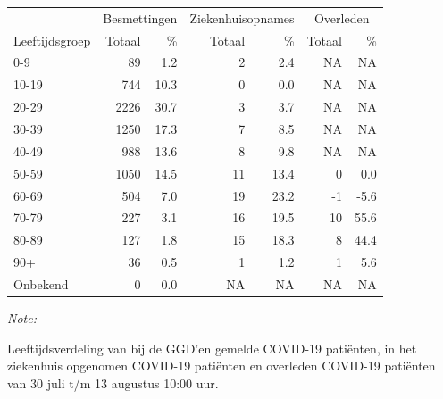 \documentclass[
  english,
  man,floatsintext]{apa6}
\begin{document}
\begin{table}[H]
\centering\begingroup\fontsize{11}{13}\selectfont

\begin{threeparttable}
\begin{tabular}{lrrrrrr}
\toprule
\multicolumn{1}{c}{ } & \multicolumn{2}{c}{Besmettingen} & \multicolumn{2}{c}{Ziekenhuisopnames} & \multicolumn{2}{c}{Overleden} \\
\cmidrule(l{3pt}r{3pt}){2-3} \cmidrule(l{3pt}r{3pt}){4-5} \cmidrule(l{3pt}r{3pt}){6-7}
Leeftijdsgroep & Totaal & \% & Totaal & \% & Totaal & \%\\
\midrule
0-9 & 89 & 1.2 & 2 & 2.4 & NA & NA\\
10-19 & 744 & 10.3 & 0 & 0.0 & NA & NA\\
20-29 & 2226 & 30.7 & 3 & 3.7 & NA & NA\\
30-39 & 1250 & 17.3 & 7 & 8.5 & NA & NA\\
40-49 & 988 & 13.6 & 8 & 9.8 & NA & NA\\
50-59 & 1050 & 14.5 & 11 & 13.4 & 0 & 0.0\\
60-69 & 504 & 7.0 & 19 & 23.2 & -1 & -5.6\\
70-79 & 227 & 3.1 & 16 & 19.5 & 10 & 55.6\\
80-89 & 127 & 1.8 & 15 & 18.3 & 8 & 44.4\\
90+ & 36 & 0.5 & 1 & 1.2 & 1 & 5.6\\
Onbekend & 0 & 0.0 & NA & NA & NA & NA\\
\bottomrule
\end{tabular}
\begin{tablenotes}
\item \textit{Note: } 
\item Leeftijdsverdeling van bij de GGD’en gemelde COVID-19 patiënten, in het ziekenhuis opgenomen COVID-19 patiënten en overleden COVID-19 patiënten van 30 juli t/m 13 augustus 10:00 uur.
\end{tablenotes}
\end{threeparttable}
\endgroup{}
\end{table}
\end{document}
